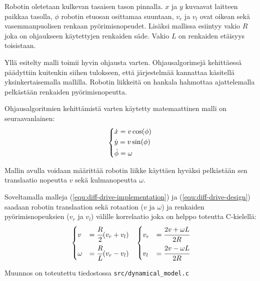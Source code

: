 \documentclass[]{article} %
\numberwithin{equation}{section}
\numberwithin{figure}{section}
\numberwithin{table}{section}
\begin{document}
Robotin oletetaan kulkevan tasaisen tason pinnalla. $x$ ja $y$ kuvaavat laitteen paikkaa tasolla, $\phi$ robotin etuosan osittamaa suuntaan, $v_r$ ja $v_l$ ovat oikean sekä vasemmanpuolisen renkaan pyörimisnopeudet. Lisäksi mallissa esiintyy vakio $R$ joka on ohjaukseen käytettyjen renkaiden säde. Vakio $L$ on renkaiden etäisyys toisistaan.



Yllä esitelty malli toimii hyvin ohjausta varten.
Ohjausalgorimejä kehittäessä päädyttiin kuitenkin siihen tulokseen, että järjestelmää kannattaa käsitellä  yksinkertaisemalla mallilla. Robotin liikkeitä on hankala hahmottaa ajattelemalla pelkästään renkaiden pyörimisnopeutta.

Ohjausalgoritmien kehittämistä varten käytetty matemaattinen malli on seuraavanlainen:
\begin{align}
    \label{equ:diff-drive-design}
    \begin{dcases}
        \dot x = v \cos(\phi)\\
        \dot y = v \sin(\phi)\\
        \dot \phi = \omega
    \end{dcases}
\end{align}

Mallin avulla voidaan määrittää robotin liikke käyttäen hyväksi pelkästään sen translaatio nopeutta $v$ sekä kulmanopeutta $\omega$.

Soveltamalla malleja (\ref{equ:diff-drive-implementation}) ja (\ref{equ:diff-drive-design}) saadaan robotin translaation sekä rotaation ($v$ ja $\omega$) ja renkaiden pyörimisnopeuksien ($v_r$ ja $v_l$) välille korrelaatio joka on helppo toteutta C-kielellä:
\begin{align}
    \label{equ:diff-drive-correlation}
    &
    \begin{dcases}
        v &= \cfrac{R}{2} (v_r + v_l)\\
        \omega &= \cfrac{R}{L} (v_r - v_l)\\
    \end{dcases}
    &
    \begin{dcases}
        v_r &= \cfrac{2v + \omega L}{2R}\\
        v_l &= \cfrac{2v - \omega L}{2R}\\
    \end{dcases}
\end{align}


Muunnos on toteutettu tiedostossa \verb+src/dynamical_model.c+
\end{document}
